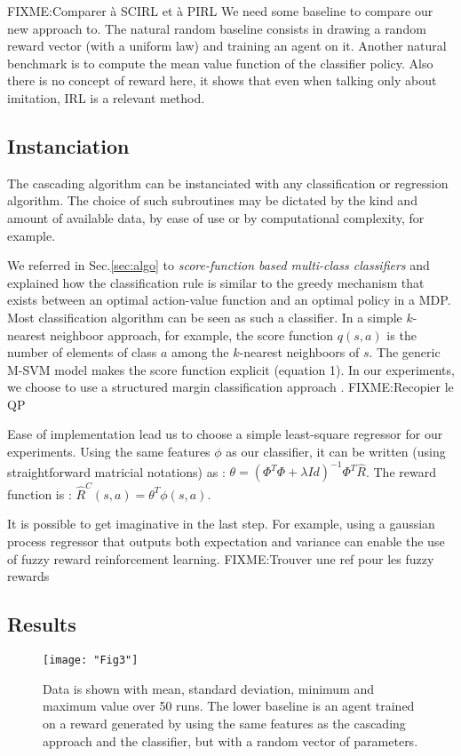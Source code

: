 \documentclass[smallextended]{svjour3}
\begin{document}
FIXME:Comparer à SCIRL et à PIRL
We need some baseline to compare our new approach to. The natural random baseline consists in drawing a random reward vector (with a uniform law) and training an agent on it. Another natural benchmark is to compute the mean value function of the classifier policy. Also there is no concept of reward here, it shows that even when talking only about imitation, IRL is a relevant method.
\subsection{Instanciation}
The cascading algorithm can be instanciated with any classification or regression algorithm. The choice of such subroutines may be dictated by the kind and amount of available data, by ease of use or by computational complexity, for example.

We referred in Sec.\ref{sec:algo} to \emph{score-function based multi-class classifiers} and explained how the classification rule is similar to the greedy mechanism that exists between an optimal action-value function and an optimal policy in a MDP. Most classification algorithm can be seen as such a classifier. In a simple $k$-nearest neighboor approach, for example, the score function $q(s,a)$ is the number of elements of class $a$ among the $k$-nearest neighboors of $s$. The generic M-SVM model makes the score function explicit \cite{guermeur2011generic} (equation 1). In our experiments, we choose to use a structured margin classification approach \cite{taskar2005learning}. FIXME:Recopier le QP

Ease of implementation lead us to choose a simple least-square regressor for our experiments. Using the same features $\phi$ as our classifier, it can be written (using straightforward matricial notations) as :  $\theta = (\Phi^T\Phi + \lambda Id)^{-1}\Phi^T\hat R$. The reward function is : $\hat R^C(s,a) = \theta^T \phi(s,a)$.

It is possible to get imaginative in the last step. For example, using a gaussian process regressor \cite{rasmussen2006gaussian} that outputs both expectation and variance can enable the use of fuzzy reward reinforcement learning. FIXME:Trouver une ref pour les fuzzy rewards

\subsection{Results}
\begin{figure}
  \texttt{[image: "Fig3"]}
  \caption{Data is shown with mean, standard deviation, minimum and maximum value over 50 runs. The lower baseline is an agent trained on a reward generated by using the same features as the cascading approach and the classifier, but with a random vector of parameters.}
  \label{fig:Highway}
\end{figure}
\end{document}
